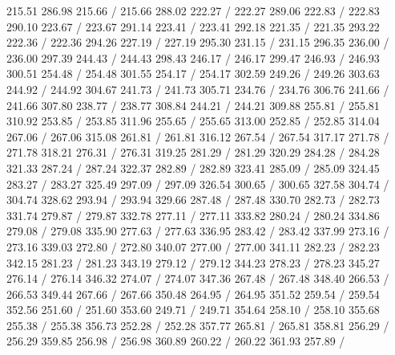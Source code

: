 { 215.51 286.98 215.66 /
 215.66 288.02 222.27 /
 222.27 289.06 222.83 /
 222.83 290.10 223.67 /
 223.67 291.14 223.41 /
 223.41 292.18 221.35 /
 221.35 293.22 222.36 /
 222.36 294.26 227.19 /
 227.19 295.30 231.15 /
 231.15 296.35 236.00 /
 236.00 297.39 244.43 /
 244.43 298.43 246.17 /
 246.17 299.47 246.93 /
 246.93 300.51 254.48 /
 254.48 301.55 254.17 /
 254.17 302.59 249.26 /
 249.26 303.63 244.92 /
 244.92 304.67 241.73 /
 241.73 305.71 234.76 /
 234.76 306.76 241.66 /
 241.66 307.80 238.77 /
 238.77 308.84 244.21 /
 244.21 309.88 255.81 /
 255.81 310.92 253.85 /
 253.85 311.96 255.65 /
 255.65 313.00 252.85 /
 252.85 314.04 267.06 /
 267.06 315.08 261.81 /
 261.81 316.12 267.54 /
 267.54 317.17 271.78 /
 271.78 318.21 276.31 /
 276.31 319.25 281.29 /
 281.29 320.29 284.28 /
 284.28 321.33 287.24 /
 287.24 322.37 282.89 /
 282.89 323.41 285.09 /
 285.09 324.45 283.27 /
 283.27 325.49 297.09 /
 297.09 326.54 300.65 /
 300.65 327.58 304.74 /
 304.74 328.62 293.94 /
 293.94 329.66 287.48 /
 287.48 330.70 282.73 /
 282.73 331.74 279.87 /
 279.87 332.78 277.11 /
 277.11 333.82 280.24 /
 280.24 334.86 279.08 /
 279.08 335.90 277.63 /
 277.63 336.95 283.42 /
 283.42 337.99 273.16 /
 273.16 339.03 272.80 /
 272.80 340.07 277.00 /
 277.00 341.11 282.23 /
 282.23 342.15 281.23 /
 281.23 343.19 279.12 /
 279.12 344.23 278.23 /
 278.23 345.27 276.14 /
 276.14 346.32 274.07 /
 274.07 347.36 267.48 /
 267.48 348.40 266.53 /
 266.53 349.44 267.66 /
 267.66 350.48 264.95 /
 264.95 351.52 259.54 /
 259.54 352.56 251.60 /
 251.60 353.60 249.71 /
 249.71 354.64 258.10 /
 258.10 355.68 255.38 /
 255.38 356.73 252.28 /
 252.28 357.77 265.81 /
 265.81 358.81 256.29 /
 256.29 359.85 256.98 /
 256.98 360.89 260.22 /
 260.22 361.93 257.89 /
}
